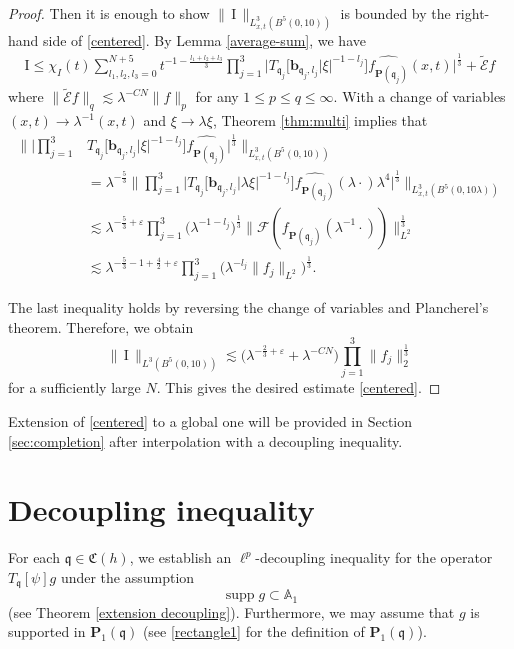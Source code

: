 \documentclass[10pt] %
{amsart}
\theoremstyle{plain}
\numberwithin{equation}{section}
\DeclareMathOperator{\supp}{supp}
\newcommand{\fq}{\mathfrak q}
\begin{document}
\begin{proof}
Then it is enough to show $ \|\, \textrm{I}  \,\|_{L_{x,t}^3(B^5(0,10))}$  is bounded by the right-hand side of \eqref{centered}. 
By Lemma \ref{average-sum}, we have 
\begin{align*}
\mathrm{I} \le  \chi_I(t) \sum_{l_1,l_2,l_3=0}^{N+5} t^{-1-\frac{l_1+l_2+l_3}3} \prod_{j=1}^3  \big| T_{\fq_j} \big[\mathbf b_{\fq_j,l_j}|\xi|^{-1-l_j}\big] \widehat {f_{\mathbf P(\fq_j)}}  (x,t) \big|^{\frac13} + \widetilde {\mathcal E} f 
\end{align*}
where $ \| \widetilde {\mathcal E} f \|_q \lesssim \lambda^{- C N } \|f\|_p $ for any $1 \le p \le q \le \infty$.
With a change of variables $(x,t)\rightarrow \lambda^{-1} (x,t)$ and $\xi\rightarrow \lambda \xi$, Theorem \ref{thm:multi} implies that
\begin{equation*}
\begin{aligned} 
\Big\| \Big|\prod_{j=1}^3   & T_{\fq_j} \big[\mathbf b_{\fq_j,l_j}|\xi|^{-1-l_j}\big] \widehat {f_{\mathbf P(\fq_j)}}\Big|^{\frac13} \Big\|_{L_{x,t}^3(B^5(0,10))} \\
&=\lambda^{-\frac 53}
\Big\| \prod_{j=1}^3   \Big| T_{\fq_j} \big[\mathbf b_{\fq_j,l_j}|\lambda\xi|^{-1-l_j}\big] \widehat {f_{\mathbf P(\fq_j)}}(\lambda \cdot) \lambda^4 \Big|^{\frac 13}\Big\|_{L_{x,t}^3(B^5(0,10\lambda))} \\
& \lesssim  \lambda^{-\frac 53+\varepsilon} 
 \prod_{j=1}^3 \big(\lambda^{-1-l_j}\big)^{\frac13}\big\| \mathcal F(f_{\mathbf P(\fq_j)}(\lambda^{-1} \cdot)) \big\|_{L^2}^{\frac13}\\
& \lesssim \lambda^{ -\frac53-1+\frac42 +\varepsilon} \prod_{j=1}^3 \big(\lambda^{-l_j}  \big\| f_j \big\|_{L^2}\big)^{\frac13} .
\end{aligned}
\end{equation*}

The last inequality holds by reversing the change of variables and Plancherel's theorem. 
Therefore, we obtain 
\[
 \| \, \mathrm{I} \,\|_{L^3(B^5(0,10))}  \lesssim \big( \lambda^{-\frac23+\varepsilon} +\lambda^{-CN} \big) \prod_{j=1}^3\|f_j\|_2^{\frac13} 
\]
for a sufficiently large $N$.
This gives the desired estimate \eqref{centered}. 
 \end{proof}
 
 Extension of \eqref{centered} to a global one will be provided in Section \ref{sec:completion} after interpolation with a decoupling inequality. 



 \section{Decoupling inequality}\label{DEC}
For each $\fq \in \mathfrak C(h)$, 
we establish an $\ell^p$-decoupling inequality for the operator $T_\fq[\psi]  g$ under the assumption
\[
\supp   g \subset \mathbb A_1 
\]
(see Theorem \ref{extension decoupling}). 
Furthermore, we may assume that $   g$ is supported in  $\mathbf P_1(\fq)$ 
(see \eqref{rectangle1} for the definition of $\mathbf P_1(\fq)$).  
\end{document}
